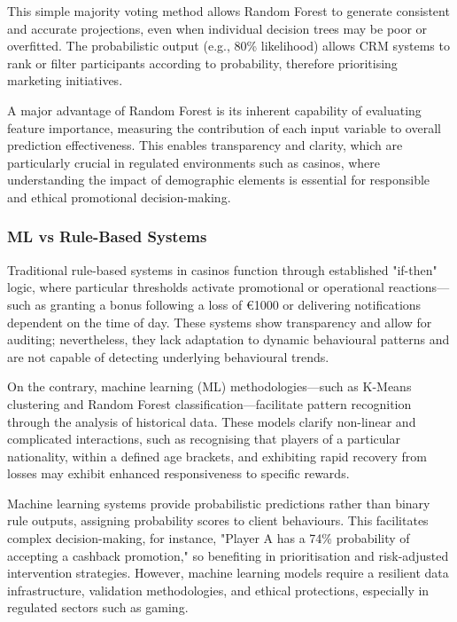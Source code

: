 \documentclass[12pt,a4paper]{report}
\begin{document}
This simple majority voting method allows Random Forest to generate consistent and accurate projections, even when individual decision trees may be poor or overfitted.  The probabilistic output (e.g., 80\% likelihood) allows CRM systems to rank or filter participants according to probability, therefore prioritising marketing initiatives.

 A major advantage of Random Forest is its inherent capability of evaluating feature importance, measuring the contribution of each input variable to overall prediction effectiveness.   This enables transparency and clarity, which are particularly crucial in regulated environments such as casinos, where understanding the impact of demographic elements is essential for responsible and ethical promotional decision-making.


\subsubsection{ML vs Rule-Based Systems}

Traditional rule-based systems in casinos function through established "if-then" logic, where particular thresholds activate promotional or operational reactions—such as granting a bonus following a loss of €1000 or delivering notifications dependent on the time of day.  These systems show transparency and allow for auditing; nevertheless, they lack adaptation to dynamic behavioural patterns and are not capable of detecting underlying behavioural trends.

 On the contrary, machine learning (ML) methodologies—such as K-Means clustering and Random Forest classification—facilitate pattern recognition through the analysis of historical data.  These models clarify non-linear and complicated interactions, such as recognising that players of a particular nationality, within a defined age brackets, and exhibiting rapid recovery from losses may exhibit enhanced responsiveness to specific rewards.

 Machine learning systems provide probabilistic predictions rather than binary rule outputs, assigning probability scores to client behaviours.  This facilitates complex decision-making, for instance, "Player A has a 74\% probability of accepting a cashback promotion," so benefiting in prioritisation and risk-adjusted intervention strategies.  However, machine learning models require a resilient data infrastructure, validation methodologies, and ethical protections, especially in regulated sectors such as gaming.
\end{document}
